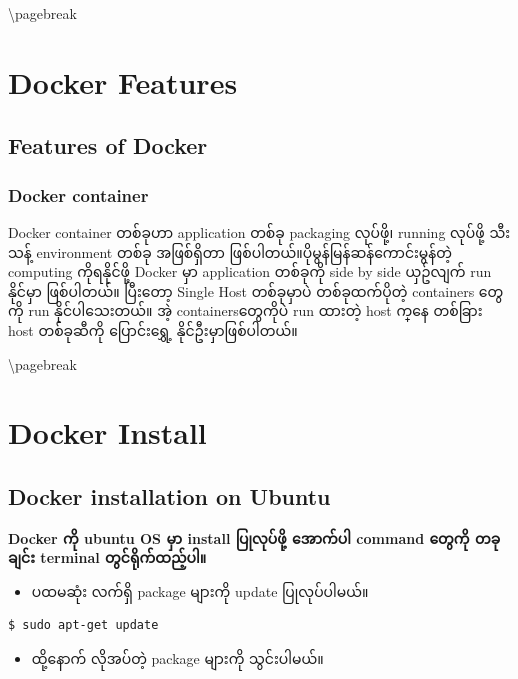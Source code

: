 \textbackslash{}pagebreak

\section{Docker Features}\label{docker-features}

\subsection{Features of Docker}\label{features-of-docker}

\subsubsection{Docker container}\label{docker-container}

Docker container တစ်ခုဟာ application တစ်ခု packaging လုပ်ဖို့၊ running
လုပ်ဖို့ သီးသန့် environment တစ်ခု အဖြစ်​ရှိ​တာ
ဖြစ်ပါတယ်။ပိုမွန်​မြန်ဆန်​ကောင်းမွန်တဲ့ computing ကိုရနိုင်ဖို့ Docker
မှာ application တစ်ခုကို side by side ယှဥ်လျက် run နိုင်မှာ ဖြစ်ပါတယ်။
ပြီး​တော့ Single Host တစ်ခုမှာပဲ တစ်ခုထက်ပိုတဲ့ containers ​တွေကို run
နိုင်ပါ​သေးတယ်။ အဲ့ containers ​တွေကိုပဲ run ထားတဲ့ host က္​နေ တစ်ခြား
host တစ်ခုဆီကို ​ပြောင်း​​ရွှေ့ နိုင်ဦးမှာဖြစ်ပါတယ်။

\textbackslash{}pagebreak

\section{Docker Install}\label{docker-install}

\subsection{Docker installation on
Ubuntu}\label{docker-installation-on-ubuntu}

\textbf{Docker ကို ubuntu OS မှာ install ပြုလုပ်ဖို့ အောက်ပါ command
တွေကို တခုချင်း terminal တွင်ရိုက်ထည့်ပါ။}

\begin{itemize}
\itemsep1pt\parskip0pt
\item
  ပထမဆုံး လက်ရှိ package များကို update ပြုလုပ်ပါမယ်။
\end{itemize}

\begin{verbatim}
$ sudo apt-get update
\end{verbatim}

\begin{itemize}
\itemsep1pt\parskip0pt
\item
  ထို့နောက် လိုအပ်တဲ့ package များကို သွင်းပါမယ်။
\end{itemize}

